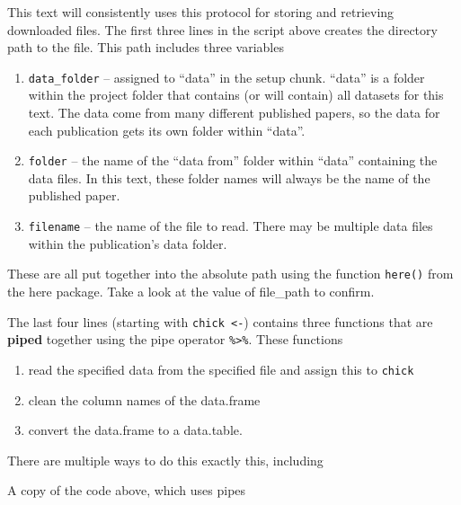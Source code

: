 \documentclass[]{book}
\newenvironment{Shaded}{\begin{snugshade}}{\end{snugshade}}
\newcommand{\CommentTok}[1]{\textcolor[rgb]{0.56,0.35,0.01}{\textit{#1}}}
\newcommand{\DataTypeTok}[1]{\textcolor[rgb]{0.13,0.29,0.53}{#1}}
\newcommand{\KeywordTok}[1]{\textcolor[rgb]{0.13,0.29,0.53}{\textbf{#1}}}
\newcommand{\NormalTok}[1]{#1}
\newcommand{\OperatorTok}[1]{\textcolor[rgb]{0.81,0.36,0.00}{\textbf{#1}}}
\newcommand{\StringTok}[1]{\textcolor[rgb]{0.31,0.60,0.02}{#1}}
\providecommand{\tightlist}{%
  \setlength{\itemsep}{0pt}\setlength{\parskip}{0pt}}
\begin{document}
This text will consistently uses this protocol for storing and retrieving downloaded files. The first three lines in the script above creates the directory path to the file. This path includes three variables

\begin{enumerate}
\def\labelenumi{\arabic{enumi}.}
\tightlist
\item
  \texttt{data\_folder} -- assigned to ``data'' in the setup chunk. ``data'' is a folder within the project folder that contains (or will contain) all datasets for this text. The data come from many different published papers, so the data for each publication gets its own folder within ``data''.
\item
  \texttt{folder} -- the name of the ``data from'' folder within ``data'' containing the data files. In this text, these folder names will always be the name of the published paper.
\item
  \texttt{filename} -- the name of the file to read. There may be multiple data files within the publication's data folder.
\end{enumerate}

These are all put together into the absolute path using the function \texttt{here()} from the here package. Take a look at the value of file\_path to confirm.

The last four lines (starting with \texttt{chick\ \textless{}-}) contains three functions that are \textbf{piped} together using the pipe operator \texttt{\%\textgreater{}\%}. These functions

\begin{enumerate}
\def\labelenumi{\arabic{enumi}.}
\tightlist
\item
  read the specified data from the specified file and assign this to \texttt{chick}
\item
  clean the column names of the data.frame
\item
  convert the data.frame to a data.table.
\end{enumerate}

There are multiple ways to do this exactly this, including

A copy of the code above, which uses pipes

\begin{Shaded}
\end{Shaded}
\end{document}

